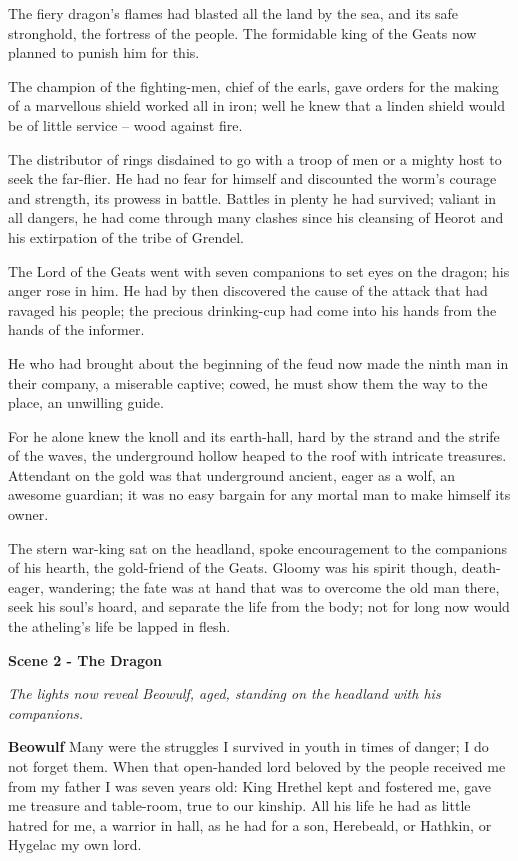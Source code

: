 \documentclass[a4paper]{article}
\begin{document}
{The fiery dragon's flames had blasted
all the land by the sea, and its safe stronghold,
the fortress of the people. The formidable king
of the Geats now planned to punish him for this.

The champion of the fighting-men, chief of the earls,
gave orders for the making of a marvellous shield
worked all in iron; well he knew
that a linden shield would be of little service
– wood against fire. 

The distributor of rings disdained to go
with a troop of men or a mighty host
to seek the far-flier. He had no fear for himself
and discounted the worm's courage and strength,
its prowess in battle. Battles in plenty
he had survived; valiant in all dangers,
he had come through many clashes since his cleansing of Heorot
and his extirpation of the tribe of Grendel.

The Lord of the Geats went with seven companions
to set eyes on the dragon; his anger rose in him.
He had by then discovered the cause of the attack
that had ravaged his people; the precious drinking-cup
had come into his hands from the hands of the informer.

He who had brought about the beginning of the feud
now made the ninth man in their company,
a miserable captive; cowed, he must show them
the way to the place, an unwilling guide.

For he alone knew the knoll and its earth-hall,
hard by the strand and the strife of the waves,
the underground hollow heaped to the roof
with intricate treasures. Attendant on the gold
was that underground ancient, eager as a wolf,
an awesome guardian; it was no easy bargain
for any mortal man to make himself its owner.

The stern war-king sat on the headland,
spoke encouragement to the companions of his hearth,
the gold-friend of the Geats. Gloomy was his spirit though,
death-eager, wandering; the fate was at hand
that was to overcome the old man there,
seek his soul's hoard, and separate
the life from the body; not for long now
would the atheling's life be lapped in flesh.

\newpage
\centerline{\textbf{Scene 2 - The Dragon}}

\centerline{\textit{The lights now reveal Beowulf, aged, standing on the headland with his companions.}}

\textbf{Beowulf} Many were the struggles I survived in youth
in times of danger; I do not forget them.
When that open-handed lord beloved by the people
received me from my father I was seven years old:
King Hrethel kept and fostered me,
gave me treasure and table-room, true to our kinship.
All his life he had as little hatred for me,
a warrior in hall, as he had for a son,
Herebeald, or Hathkin, or Hygelac my own lord.

}
\end{document}
